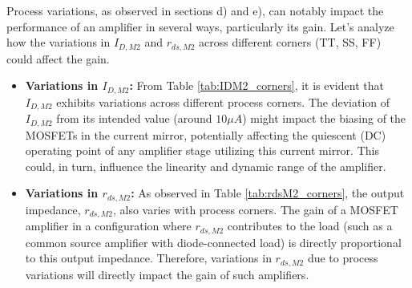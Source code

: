     Process variations, as observed in sections d) and e), can notably impact the performance of an amplifier in several ways, particularly its gain. Let's analyze how the variations in \(I_{D, M 2}\) and \(r_{d s, M 2}\) across different corners (TT, SS, FF) could affect the gain.
    
    \begin{itemize}
        \item \textbf{Variations in \(I_{D, M 2}\):} From Table \ref{tab:IDM2_corners}, it is evident that \(I_{D, M 2}\) exhibits variations across different process corners. The deviation of \(I_{D, M 2}\) from its intended value (around \(10 \mu A\)) might impact the biasing of the MOSFETs in the current mirror, potentially affecting the quiescent (DC) operating point of any amplifier stage utilizing this current mirror. This could, in turn, influence the linearity and dynamic range of the amplifier.
        
        \item \textbf{Variations in \(r_{d s, M 2}\):} As observed in Table \ref{tab:rdsM2_corners}, the output impedance, \(r_{d s, M 2}\), also varies with process corners. The gain of a MOSFET amplifier in a configuration where \(r_{d s, M 2}\) contributes to the load (such as a common source amplifier with diode-connected load) is directly proportional to this output impedance. Therefore, variations in \(r_{d s, M 2}\) due to process variations will directly impact the gain of such amplifiers.
    \end{itemize}
    
